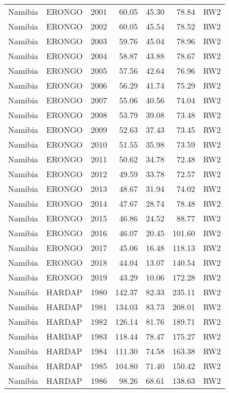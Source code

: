 \begin{longtable}{lllrrrl}
  Namibia & ERONGO & 2001 & 60.05 & 45.30 & 78.84 & RW2 \\ 
  Namibia & ERONGO & 2002 & 60.05 & 45.54 & 78.52 & RW2 \\ 
  Namibia & ERONGO & 2003 & 59.76 & 45.04 & 78.96 & RW2 \\ 
  Namibia & ERONGO & 2004 & 58.87 & 43.88 & 78.67 & RW2 \\ 
  Namibia & ERONGO & 2005 & 57.56 & 42.64 & 76.96 & RW2 \\ 
  Namibia & ERONGO & 2006 & 56.29 & 41.74 & 75.29 & RW2 \\ 
  Namibia & ERONGO & 2007 & 55.06 & 40.56 & 74.04 & RW2 \\ 
  Namibia & ERONGO & 2008 & 53.79 & 39.08 & 73.48 & RW2 \\ 
  Namibia & ERONGO & 2009 & 52.63 & 37.43 & 73.45 & RW2 \\ 
  Namibia & ERONGO & 2010 & 51.55 & 35.98 & 73.59 & RW2 \\ 
  Namibia & ERONGO & 2011 & 50.62 & 34.78 & 72.48 & RW2 \\ 
  Namibia & ERONGO & 2012 & 49.59 & 33.78 & 72.57 & RW2 \\ 
  Namibia & ERONGO & 2013 & 48.67 & 31.94 & 74.02 & RW2 \\ 
  Namibia & ERONGO & 2014 & 47.67 & 28.74 & 78.48 & RW2 \\ 
  Namibia & ERONGO & 2015 & 46.86 & 24.52 & 88.77 & RW2 \\ 
  Namibia & ERONGO & 2016 & 46.07 & 20.45 & 101.60 & RW2 \\ 
  Namibia & ERONGO & 2017 & 45.06 & 16.48 & 118.13 & RW2 \\ 
  Namibia & ERONGO & 2018 & 44.04 & 13.07 & 140.54 & RW2 \\ 
  Namibia & ERONGO & 2019 & 43.29 & 10.06 & 172.28 & RW2 \\ 
  Namibia & HARDAP & 1980 & 142.37 & 82.33 & 235.11 & RW2 \\ 
  Namibia & HARDAP & 1981 & 134.03 & 83.73 & 208.01 & RW2 \\ 
  Namibia & HARDAP & 1982 & 126.14 & 81.76 & 189.71 & RW2 \\ 
  Namibia & HARDAP & 1983 & 118.44 & 78.47 & 175.27 & RW2 \\ 
  Namibia & HARDAP & 1984 & 111.30 & 74.58 & 163.38 & RW2 \\ 
  Namibia & HARDAP & 1985 & 104.80 & 71.40 & 150.42 & RW2 \\ 
  Namibia & HARDAP & 1986 & 98.26 & 68.61 & 138.63 & RW2 \\ 

\end{longtable}
